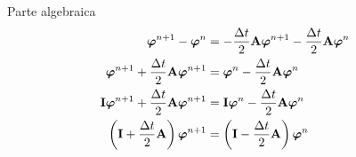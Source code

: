 Parte algebraica
\begin{align*}
  \bm{\varphi}^{n+1} - \bm{\varphi}^{n}
    &= -\frac{\Delta t}{2}\mathbf{A}\bm{\varphi}^{n+1} - \frac{\Delta t}{2}\mathbf{A}\bm{\varphi}^{n}
    && \\
  \bm{\varphi}^{n+1} + \frac{\Delta t}{2}\mathbf{A}\bm{\varphi}^{n+1}
    &= \bm{\varphi}^{n} - \frac{\Delta t}{2}\mathbf{A}\bm{\varphi}^{n}
    && \\
  \mathbf{I}\bm{\varphi}^{n+1} + \frac{\Delta t}{2}\mathbf{A}\bm{\varphi}^{n+1}
    &= \mathbf{I}\bm{\varphi}^{n} - \frac{\Delta t}{2}\mathbf{A}\bm{\varphi}^{n}
    && \\
  \left(\mathbf{I} + \frac{\Delta t}{2}\mathbf{A}\right)\bm{\varphi}^{n+1}
    &= \left(\mathbf{I} - \frac{\Delta t}{2}\mathbf{A}\right)\bm{\varphi}^{n}
    &&
\end{align*}

